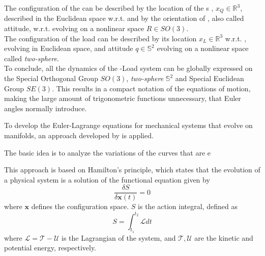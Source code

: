 
The configuration of the  can be described by the location of the s , $x_Q\in \mathbb{R}^3 $, described in the Euclidean space w.r.t. \IF and by the orientation of \BF, also called attitude, w.r.t. \IF evolving on a nonlinear space $R\in SO(3) $.\\
The configuration of the load can be described by its location $x_L\in \mathbb{R}^3 $ w.r.t. \IF, evolving in Euclidean space, and attitude $ q\in \mathbb{S}^2 $ evolving on a nonlinear space called \textit{two-sphere}.\\
To conclude, all the dynamics of the -Load system can be globally expressed on the Special Orthogonal Group $SO(3)$, \textit{two-sphere} $ \mathbb{S}^2 $ and Special Euclidean Group $ SE(3) $. This results in a compact notation of the equations of motion, making the large amount of trigonometric functions unnecessary, that Euler angles normally introduce. 

To develop the Euler-Lagrange equations for mechanical systems that evolve on manifolds, an approach developed by \cite{Lee2008,Lee2005,Lee2009,Lee2011} is applied. 

The basic idea is to analyze the variations of the curves that are e	


This approach is based on Hamilton's principle, which states that the evolution of a physical system is a solution of the functional equation given by
\begin{equation}\label{key}
\frac{\delta S}{\delta \mathbf{x}(t)}=0
\end{equation}
where $ \mathbf{x} $ defines the configuration space. $ S $ is the action integral, defined as
\begin{equation}\label{eq:actionintegral}
S=\int_{t_1}^{t_2}\mathcal{L}dt
\end{equation}
where $\mathcal{L}=\mathcal{T}-\mathcal{U} $ is the Lagrangian of the system, and $\mathcal{T},\mathcal{U}$ are the kinetic and potential energy, respectively. 

